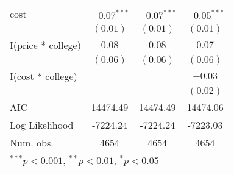 \begin{table}
\begin{center}
\begin{tabular}{l c c c }
cost               & $-0.07^{***}$ & $-0.07^{***}$ & $-0.05^{***}$ \\
                   & $(0.01)$      & $(0.01)$      & $(0.01)$      \\
I(price * college) & $0.08$        & $0.08$        & $0.07$        \\
                   & $(0.06)$      & $(0.06)$      & $(0.06)$      \\
I(cost * college)  &               &               & $-0.03$       \\
                   &               &               & $(0.02)$      \\
\hline
AIC                & 14474.49      & 14474.49      & 14474.06      \\
Log Likelihood     & -7224.24      & -7224.24      & -7223.03      \\
Num. obs.          & 4654          & 4654          & 4654          \\
\hline
\multicolumn{4}{l}{\scriptsize{$^{***}p<0.001$, $^{**}p<0.01$, $^*p<0.05$}}
\end{tabular}
\end{center}
\end{table}

